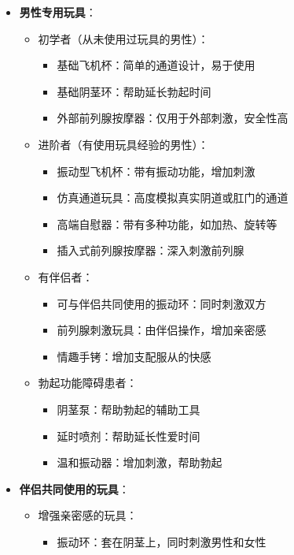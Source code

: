 \documentclass[12pt,UTF8]{ctexbook}
\begin{document}
\begin{itemize}
\begin{itemize}
\begin{itemize}
			\item 温和振动器：帮助维持性敏感度
			\item 阴道哑铃：帮助锻炼盆底肌
		\end{itemize}
	\end{itemize}
	\item \textbf{男性专用玩具}：
	\begin{itemize}
		\item 初学者（从未使用过玩具的男性）：
		\begin{itemize}
			\item 基础飞机杯：简单的通道设计，易于使用
			\item 基础阴茎环：帮助延长勃起时间
			\item 外部前列腺按摩器：仅用于外部刺激，安全性高
		\end{itemize}
		\item 进阶者（有使用玩具经验的男性）：
		\begin{itemize}
			\item 振动型飞机杯：带有振动功能，增加刺激
			\item 仿真通道玩具：高度模拟真实阴道或肛门的通道
			\item 高端自慰器：带有多种功能，如加热、旋转等
			\item 插入式前列腺按摩器：深入刺激前列腺
		\end{itemize}
		\item 有伴侣者：
		\begin{itemize}
			\item 可与伴侣共同使用的振动环：同时刺激双方
			\item 前列腺刺激玩具：由伴侣操作，增加亲密感
			\item 情趣手铐：增加支配服从的快感
		\end{itemize}
		\item 勃起功能障碍患者：
		\begin{itemize}
			\item 阴茎泵：帮助勃起的辅助工具
			\item 延时喷剂：帮助延长性爱时间
			\item 温和振动器：增加刺激，帮助勃起
		\end{itemize}
	\end{itemize}
	\item \textbf{伴侣共同使用的玩具}：
	\begin{itemize}
		\item 增强亲密感的玩具：
		\begin{itemize}
			\item 振动环：套在阴茎上，同时刺激男性和女性

\end{itemize}
\end{itemize}
\end{itemize}
\end{document}
